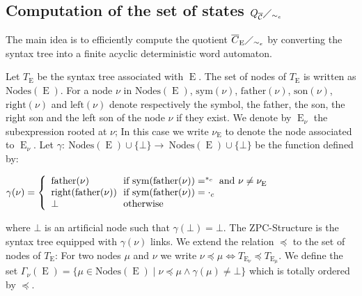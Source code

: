 \documentclass{llncs}
\DeclareMathOperator{\E}{E}
\def\b#1{\overline{#1}}
\begin{document}
\subsection{Computation of the set of states $Q_{\b{\cal C}}\diagup_{\sim_e}$}

The main idea is to efficiently compute the quotient $\b C_{\E}\diagup_{\sim_e}$ by converting the syntax tree into a finite acyclic deterministic word automaton. 

Let $T_{\E}$ be the syntax tree associated with 
$\E$.
The set of nodes of $T_{\E}$ is written as $\mathrm{Nodes}(\E)$. For a node $\nu$ in $\mathrm{Nodes}(\E)$, $\mathrm{sym}(\nu)$, $\mathrm{father}(\nu)$, $\mathrm{son}(\nu)$, $\mathrm{right}(\nu)$ and $\mathrm{left}(\nu)$ denote respectively the symbol, the father, the son, the right son and the left son of the node $\nu$ if they exist. We denote by $\E_{\nu}$ the subexpression rooted at $\nu$; In this case we write $\nu_{\E}$ to denote the node associated to $\E_{\nu}$. Let $\gamma:~\mathrm{Nodes}(\E)\cup\{\bot\}\rightarrow ~\mathrm{Nodes}(\E)\cup\{\bot\}$ be the function defined by: 

\centerline{
    $\gamma(\nu)= \left\{
    \begin{array}{l@{\ }l}
    \mathrm{father}(\nu) & \mbox{ if } \mathrm{sym}(\mathrm{father}(\nu))=^{*_c} \mbox{ and }\nu\neq \nu_{\E}\\
   \mathrm{right}(\mathrm{father}(\nu)) & \mbox{ if } \mathrm{sym}(\mathrm{father}(\nu))=\cdot_c\\
    \bot & \mbox{ otherwise }\\
    \end{array}\right.$
}

\noindent where $\bot$ is an artificial node such that $\gamma(\bot)=\bot$. The ZPC-Structure is the syntax tree equipped with $\gamma(\nu)$  
links.
We extend the relation $\preccurlyeq$ to the set of nodes of $T_{\E}$: For two nodes $\mu$ and $\nu$ we write $\nu\preccurlyeq\mu\Leftrightarrow T_{\E_{\nu}}\preccurlyeq T_{\E_{\mu}}$. We define the set $\Gamma_{\nu}(\E)=\{\mu\in\mathrm{Nodes}(\E)\mid \nu \preccurlyeq \mu \land \gamma(\mu)\neq \bot\}$ which is totally ordered by $\preccurlyeq$.
\end{document}
